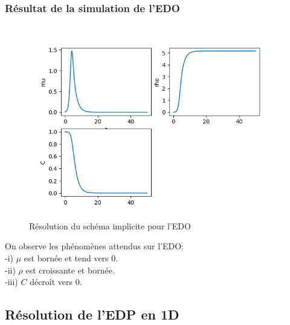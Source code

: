\subsubsection{Résultat de la simulation de l'EDO}
\begin{figure}[hbt!]
\centering
\includegraphics[width=.9\textwidth]{Images/edo_euler_implicite.png}
\caption{Résolution du schéma implicite pour l'EDO}
\end{figure}
 On observe les phénomènes attendus sur l'EDO:\\
 -i) $\mu$ est bornée et tend vers 0.\\
 -ii) $\rho$ est croissante et bornée.\\
 -iii) $C$ décroît vers 0.
\newpage
\subsection{Résolution de l'EDP en 1D}

